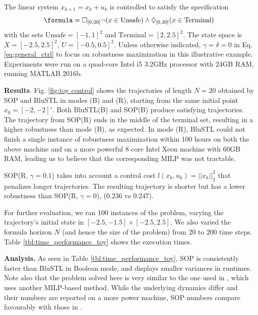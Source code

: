 \begin{exmp}
\label{ex:toyproblem}
The linear system $x_{k+1} = x_k + u_k$ is controlled
to satisfy the specification
\[\formula = \always_{[0,20]} \neg (x \in \text{Unsafe}) \land \eventually_{[0,20]} (x \in \text{Terminal})\]
with the sets $\text{Unsafe}=[-1,1]^2$ and $\text{Terminal}=[2,2.5]^2$. 
The state space is $X=[-2.5,2.5]^2$, $U=[-0.5,0.5]^2$.
Unless otherwise indicated, $\gamma=\delta=0$ in Eq. \eqref{eq:general_ctrl} to focus on robustness maximization in this illustrative example. 
Experiments were run on a quad-core Intel i5 3.2GHz processor with 24GB RAM, running MATLAB 2016b.

\textbf{Results}.
Fig. \ref{fig:toy control} shows the trajectories of length $N=20$ obtained by SOP and BluSTL in modes (B) and (R), starting from the same initial point $x_0=[-2,-2]'$.
Both BluSTL(B) and SOP(B) produce satisfying trajectories. 
The trajectory from SOP(R) ends in the middle of the terminal set, resulting in a higher robustness than mode (B), as expected. 
In mode (R), BluSTL could not finish a single instance of robustness maximization within 100 hours on both the above machine and on a more powerful 8 core Intel Xeon machine with 60GB RAM, leading us to believe that the corresponding MILP was not tractable.
 
SOP(R, $\gamma\!=\!0.1$) takes into account a control cost $l(x_k,u_k) = ||x_k||_{2}^2$ that penalizes longer trajectories.
The resulting trajectory is shorter but has a lower robustness than SOP(R, $\gamma = 0$), ($0.236$ vs $0.247$).

For further evaluation, we ran 100 instances of the problem, varying the trajectory's initial state in $[-2.5,-1.5] \times [-2.5,2.5]$. 
We also varied the formula horizon $N$ (and hence the size of the problem) from $20$ to $200$ time steps. 
Table \ref{tbl:time_performance_toy} shows the execution times. 


\textbf{Analysis.}
As seen in Table \ref{tbl:time_performance_toy}, SOP is consistently faster than BluSTL in Boolean mode, and displays smaller variances in runtimes. 
Note also that the problem solved here is very similar to the one used in \cite{Saha_acc16}, which uses another MILP-based method. 
While the underlying dynamics differ and their numbers are reported on a more power machine, 
SOP numbers compare favourably with those in \cite{Saha_acc16}.


\end{exmp}

